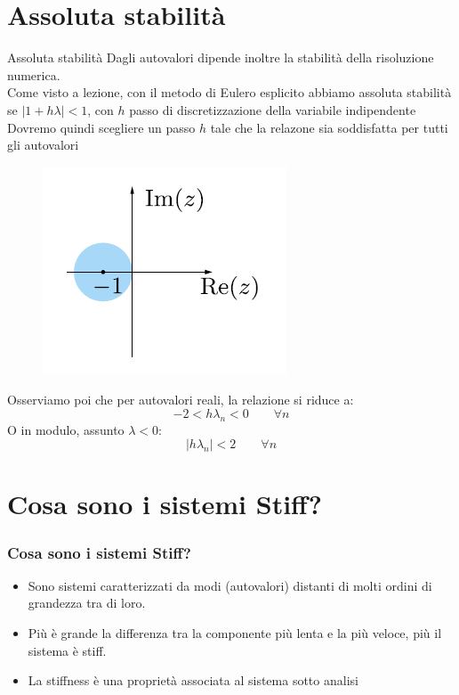 \documentclass[aspectratio=169, 10pt, handout,usenames,dvipsnames]{beamer}
\begin{document}
\section{Assoluta stabilità}%
    \begin{frame}{Assoluta stabilità}
        Dagli autovalori dipende inoltre la stabilità della risoluzione numerica.\\
        Come visto a lezione, con il metodo di Eulero esplicito abbiamo assoluta stabilità se \(|1+h\lambda| < 1\), con $h$ passo di discretizzazione della variabile indipendente\\
        Dovremo quindi scegliere un passo $h$ tale che la relazone sia soddisfatta per \alert{tutti} gli autovalori
        \medskip
        \begin{multicols}{2}
        \begin{figure}
        \centering
        \includegraphics[width=0.8\linewidth]{fig6.png}
        \label{fig:my_label}
        \end{figure}
        \columnbreak
        \bigskip\bigskip
        Osserviamo poi che per autovalori reali, la relazione si riduce a: \large
        \[
        -2 < h \lambda_n < 0 \qquad \forall n
        \] \normalsize
        O in modulo, assunto $\lambda<0$: \large
        \[
        |h \lambda_n| < 2 \qquad \forall n
        \]
        \end{multicols}
        
    \end{frame}
    
\section{Cosa sono i sistemi Stiff?}\label{sec:sec1}
\begin{frame} \frametitle{Cosa sono i sistemi Stiff?}
    \begin{itemize}
        \item Sono sistemi caratterizzati da modi (autovalori) distanti di molti ordini di grandezza tra di loro. 
        \item Più è grande la differenza tra la componente più lenta e la più veloce, più il sistema è stiff.
        \item La stiffness è una proprietà associata al sistema sotto analisi
    \end{itemize}
\end{frame}
\end{document}
